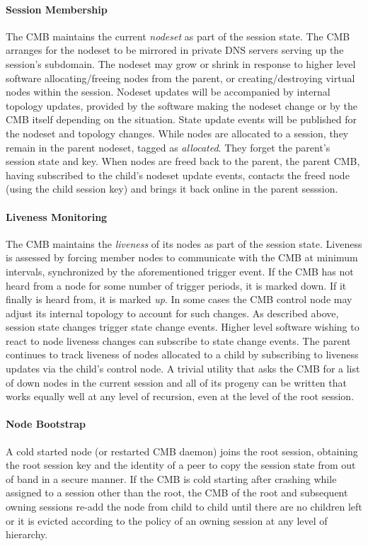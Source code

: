 \paragraph{Session Membership}
The CMB maintains the current {\em nodeset} as part of the session state.
The CMB arranges for the nodeset to be mirrored in private DNS servers
serving up the session's subdomain.
The nodeset may grow or shrink in response to higher level software
allocating/freeing nodes from the parent, or creating/destroying 
virtual nodes within the session.
Nodeset updates will be accompanied by internal topology updates, provided by
the software making the nodeset change or by the CMB itself depending
on the situation.
State update events will be published for the nodeset and topology changes.
While nodes are allocated to a session, they remain in the parent nodeset,
tagged as {\em allocated}.  They forget the parent's session state and key.
When nodes are freed back to the parent, the parent CMB, having subscribed
to the child's nodeset update events, contacts the freed node (using the
child session key) and brings it back online in the parent sesssion.  

\paragraph{Liveness Monitoring}
The CMB maintains the {\em liveness} of its nodes as part
of the session state.
Liveness is assessed by forcing member nodes to communicate with the CMB
at minimum intervals, synchronized by the aforementioned trigger event.
If the CMB has not heard from a node for some number
of trigger periods, it is marked down.
If it finally is heard from, it is marked {\em up}.
In some cases the CMB control node may adjust its internal topology
to account for such changes.
As described above, session state changes trigger state change events.
Higher level software wishing to react to node liveness changes can
subscribe to state change events.
The parent continues to track liveness of nodes allocated to a child by
subscribing to liveness updates via the child's control node.  A trivial
utility that asks the CMB for a list of down nodes in the current session
and all of its progeny can be written that works equally well at any level of recursion,
even at the level of the root session.

\paragraph{Node Bootstrap}
A cold started node (or restarted CMB daemon) joins the root session,
obtaining the root session key and the identity of a peer to copy the
session state from out of band in a secure manner.
If the CMB is cold starting after crashing while assigned to
a session other than the root, the CMB of the root and subsequent owning
sessions re-add the node from child to child until there are no children
left or it is evicted according to the policy of an owning session
at any level of hierarchy.

